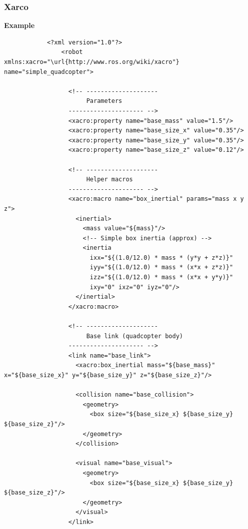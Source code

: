 \documentclass{book}
\providecommand{\ProjectDeepHeading}[2]{%
    \par\medskip\noindent\textbf{#2}\par\smallskip
}
\begin{document}
\subsubsection{Xarco}


\ProjectDeepHeading{1}{Example}
        \begin{verbatim}
            <?xml version="1.0"?>
                <robot xmlns:xacro="\url{http://www.ros.org/wiki/xacro"} name="simple_quadcopter">
                
                  <!-- --------------------
                       Parameters
                  --------------------- -->
                  <xacro:property name="base_mass" value="1.5"/>
                  <xacro:property name="base_size_x" value="0.35"/>
                  <xacro:property name="base_size_y" value="0.35"/>
                  <xacro:property name="base_size_z" value="0.12"/>
                
                  <!-- --------------------
                       Helper macros
                  --------------------- -->
                  <xacro:macro name="box_inertial" params="mass x y z">
                    <inertial>
                      <mass value="${mass}"/>
                      <!-- Simple box inertia (approx) -->
                      <inertia
                        ixx="${(1.0/12.0) * mass * (y*y + z*z)}"
                        iyy="${(1.0/12.0) * mass * (x*x + z*z)}"
                        izz="${(1.0/12.0) * mass * (x*x + y*y)}"
                        ixy="0" ixz="0" iyz="0"/>
                    </inertial>
                  </xacro:macro>
                
                  <!-- --------------------
                       Base link (quadcopter body)
                  --------------------- -->
                  <link name="base_link">
                    <xacro:box_inertial mass="${base_mass}" x="${base_size_x}" y="${base_size_y}" z="${base_size_z}"/>
                
                    <collision name="base_collision">
                      <geometry>
                        <box size="${base_size_x} ${base_size_y} ${base_size_z}"/>
                      </geometry>
                    </collision>
                
                    <visual name="base_visual">
                      <geometry>
                        <box size="${base_size_x} ${base_size_y} ${base_size_z}"/>
                      </geometry>
                    </visual>
                  </link>
                

\end{verbatim}
\end{document}
